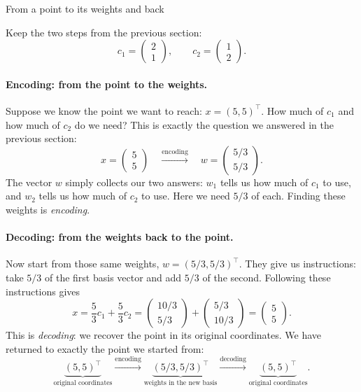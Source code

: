 \documentclass[a4paper,12pt,oneside]{report}
\begin{document}
\begin{framedexample}{From a point to its weights and back}

Keep the two steps from the previous section:
\[
  c_1=\begin{pmatrix}2\\1\end{pmatrix},\qquad
  c_2=\begin{pmatrix}1\\2\end{pmatrix}.
\]

\paragraph{Encoding: from the point to the weights.}
Suppose we know the point we want to reach:
$x=(5,5)^\top$. How much of $c_1$ and how much of $c_2$ do we need?
This is exactly the question we answered in the previous section:
\[
  x=\begin{pmatrix}5\\5\end{pmatrix}
  \quad\xrightarrow{\text{encoding}}\quad
  w=\begin{pmatrix}5/3\\5/3\end{pmatrix}.
\]
The vector $w$ simply collects our two answers: $w_1$ tells us how
much of $c_1$ to use, and $w_2$ tells us how much of $c_2$ to use.
Here we need $5/3$ of each. Finding these weights is \emph{encoding}.

\paragraph{Decoding: from the weights back to the point.}
Now start from those same weights, $w=(5/3,5/3)^\top$.
They give us instructions: take $5/3$ of the first basis vector and
add $5/3$ of the second. Following these instructions gives
\[
  x=\frac53c_1+\frac53c_2
   =\begin{pmatrix}10/3\\5/3\end{pmatrix}
    +\begin{pmatrix}5/3\\10/3\end{pmatrix}
   =\begin{pmatrix}5\\5\end{pmatrix}.
\]
This is \emph{decoding}: we recover the point in its original
coordinates. We have returned to exactly the point we started from:
\[
  \underbrace{(5,5)^\top}_{\text{original coordinates}}
  \xrightarrow{\text{encoding}}
  \underbrace{(5/3,5/3)^\top}_{\text{weights in the new basis}}
  \xrightarrow{\text{decoding}}
  \underbrace{(5,5)^\top}_{\text{original coordinates}}.
\]


\end{framedexample}
\end{document}
